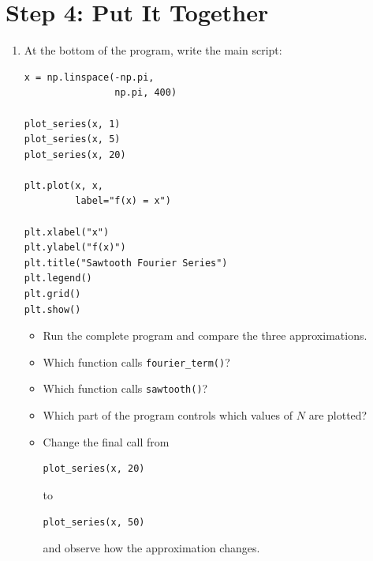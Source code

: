 \documentclass{article}
\begin{document}
\section{Step 4: Put It Together}

\begin{enumerate}

\item At the bottom of the program, write the main script:

\begin{verbatim}
x = np.linspace(-np.pi,
                np.pi, 400)

plot_series(x, 1)
plot_series(x, 5)
plot_series(x, 20)

plt.plot(x, x,
         label="f(x) = x")

plt.xlabel("x")
plt.ylabel("f(x)")
plt.title("Sawtooth Fourier Series")
plt.legend()
plt.grid()
plt.show()
\end{verbatim}

\begin{itemize}

\item Run the complete program and compare the three
approximations.

\item Which function calls \texttt{fourier\_term()}?

\item Which function calls \texttt{sawtooth()}?

\item Which part of the program controls which values of
$N$ are plotted?

\item Change the final call from

\begin{verbatim}
plot_series(x, 20)
\end{verbatim}

to

\begin{verbatim}
plot_series(x, 50)
\end{verbatim}

and observe how the approximation changes.

\end{itemize}

\end{enumerate}
\end{document}
